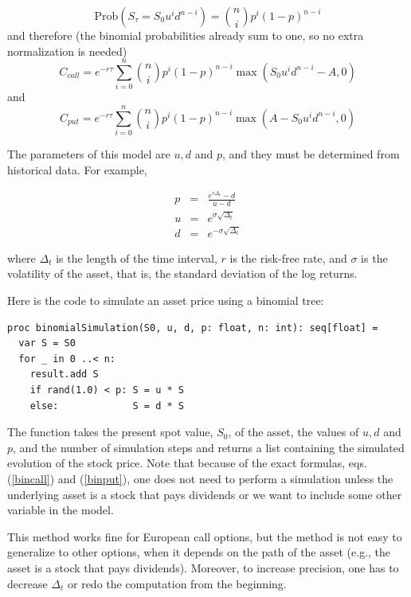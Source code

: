 \documentclass[justified, sixbynine]{tufte-book}
\theoremstyle{plain}%
\newtheorem * {corollary}{Corollary}
\theoremstyle{definition}
\theoremstyle{remark}
\newtheorem * {remark}{Remark}
\newtheorem * {note}{Note}
\begin{document}
\begin{fullwidth}
\begin{equation}
\textrm{Prob}(S_\tau =S_0u^id^{n-i})=\binom nip^i(1-p)^{n-i}
\end{equation}
and therefore (the binomial probabilities already sum to one, so no extra normalization is needed)
\begin{equation}
C_{call}=e^{-r\tau }\sum_{i=0}^{n}\binom nip^i(1-p)^{n-i}\max
(S_0u^id^{n-i}-A, 0)  \label{bincall}
\end{equation}
and
\begin{equation}
C_{put}=e^{-r\tau }\sum_{i=0}^{n}\binom nip^i(1-p)^{n-i}\max
(A-S_0u^id^{n-i}, 0)  \label{binput}
\end{equation}

The parameters of this model are $u, d$ and $p$, and they must be determined
from historical data. For example,

\begin{eqnarray}
p &=& \frac{e^{r\Delta_t} - d}{u-d} \\
u &=& e^{\sigma\sqrt{\Delta_t}} \\
d &=& e^{-\sigma\sqrt{\Delta_t}}
\end{eqnarray}

where $\Delta_t$ is the length of the time interval, $r$ is the risk-free rate, and $\sigma$ is the volatility of the asset, that is, the standard deviation of the log returns.

Here is the code to simulate an asset price using a binomial tree:
\begin{lstlisting}
proc binomialSimulation(S0, u, d, p: float, n: int): seq[float] =
  var S = S0
  for _ in 0 ..< n:
    result.add S
    if rand(1.0) < p: S = u * S
    else:             S = d * S
\end{lstlisting}

The function takes the present spot value, $S_0$, of the asset, the values
of $u, d$ and $p$, and the number of simulation steps and returns a list
containing the simulated evolution of the stock price. Note that because of
the exact formulas, eqs.(\ref{bincall}) and (\ref{binput}), one does not need
to perform a simulation unless the underlying asset is a stock that pays
dividends or we want to include some other variable in the model.

This method works fine for European call options, but the method is not easy to
generalize to other options, when it depends on the path of
the asset (e.g., the asset is a stock that pays dividends). Moreover,
to increase precision, one has to decrease $\Delta _t$ or redo the
computation from the beginning.


\end{fullwidth}
\end{document}
